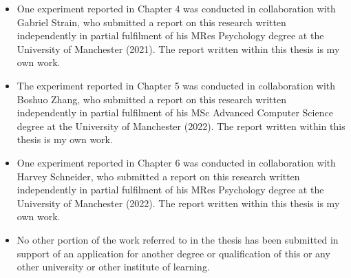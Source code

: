 \begin{itemize} 
\item One experiment reported in Chapter 4 was conducted in collaboration with Gabriel Strain, who submitted a report on this research written independently in partial fulfilment of his MRes Psychology degree at the University of Manchester (2021). The report written within this thesis is my own work.
\item The experiment reported in Chapter 5 was conducted in collaboration with Boshuo Zhang, who submitted a report on this research written independently in partial fulfilment of his MSc Advanced Computer Science degree at the University of Manchester (2022). The report written within this thesis is my own work.
\item One experiment reported in Chapter 6 was conducted in collaboration with Harvey Schneider, who submitted a report on this research written independently in partial fulfilment of his MRes Psychology degree at the University of Manchester (2022). The report written within this thesis is my own work.
\item No other portion of the work referred to in the thesis has been submitted in support of an application for another degree or qualification of this or any other university or other institute of learning.\\
\end{itemize}